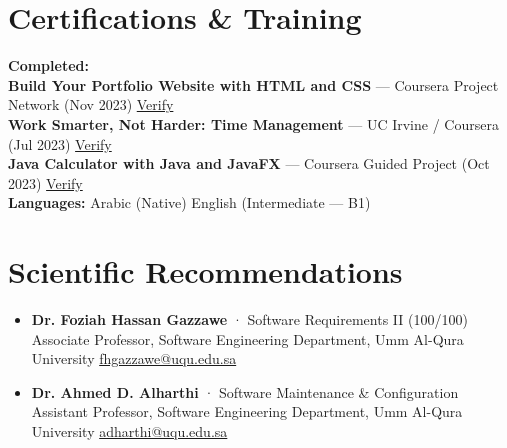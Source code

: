 \documentclass[11pt,a4paper]{article}
\newcommand{\resumeItem}[1]{\item\small{#1}}
\begin{document}
\section{Certifications \& Training}
\small
\textbf{Completed:}\\
\textbf{Build Your Portfolio Website with HTML and CSS} — Coursera Project Network (Nov 2023) \textbar{}
\href{https://coursera.org/verify/M53HGSHR98Z8}{Verify}\\
\textbf{Work Smarter, Not Harder: Time Management} — UC Irvine / Coursera (Jul 2023) \textbar{}
\href{https://coursera.org/verify/C6M96FDN5RHA}{Verify}\\
\textbf{Java Calculator with Java and JavaFX} — Coursera Guided Project (Oct 2023) \textbar{}
\href{https://coursera.org/verify/2KX28F9G4VR4}{Verify}\\[4pt]
\textbf{Languages:} Arabic (Native) \textbar{} English (Intermediate — B1)

\section{Scientific Recommendations}
\small
\begin{itemize}[leftmargin=*, nosep, topsep=2pt]
  \resumeItem{\textbf{Dr. Foziah Hassan Gazzawe} · Software Requirements II (100/100)\\
  Associate Professor, Software Engineering Department, Umm Al-Qura University \textbar{}
  \href{mailto:fhgazzawe@uqu.edu.sa}{fhgazzawe@uqu.edu.sa}}
  \resumeItem{\textbf{Dr. Ahmed D. Alharthi} · Software Maintenance \& Configuration\\
  Assistant Professor, Software Engineering Department, Umm Al-Qura University \textbar{}
  \href{mailto:adharthi@uqu.edu.sa}{adharthi@uqu.edu.sa}}
\end{itemize}
\end{document}
